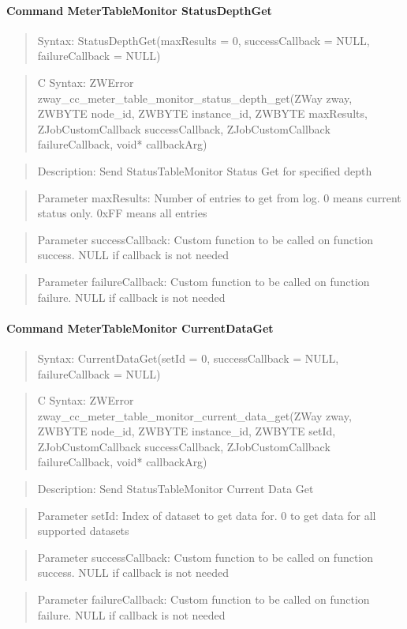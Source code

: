 \paragraph{Command MeterTableMonitor StatusDepthGet}
\begin{quote}Syntax: StatusDepthGet(maxResults = 0, successCallback = NULL, failureCallback = NULL)\end{quote}
\begin{quote}C Syntax: ZWError zway\_cc\_meter\_table\_monitor\_status\_depth\_get(ZWay zway, ZWBYTE node\_id, ZWBYTE instance\_id, ZWBYTE maxResults, ZJobCustomCallback successCallback, ZJobCustomCallback failureCallback, void* callbackArg)\end{quote}
\begin{quote}Description: Send StatusTableMonitor Status Get for specified depth\end{quote}
\begin{quote}Parameter maxResults: Number of entries to get from log. 0 means current status only. 0xFF means all entries\end{quote}
\begin{quote}Parameter successCallback: Custom function to be called on function success. NULL if callback is not needed\end{quote}
\begin{quote}Parameter failureCallback: Custom function to be called on function failure. NULL if callback is not needed\end{quote}


\paragraph{Command MeterTableMonitor CurrentDataGet}
\begin{quote}Syntax: CurrentDataGet(setId = 0, successCallback = NULL, failureCallback = NULL)\end{quote}
\begin{quote}C Syntax: ZWError zway\_cc\_meter\_table\_monitor\_current\_data\_get(ZWay zway, ZWBYTE node\_id, ZWBYTE instance\_id, ZWBYTE setId, ZJobCustomCallback successCallback, ZJobCustomCallback failureCallback, void* callbackArg)\end{quote}
\begin{quote}Description: Send StatusTableMonitor Current Data Get\end{quote}
\begin{quote}Parameter setId: Index of dataset to get data for. 0 to get data for all supported datasets\end{quote}
\begin{quote}Parameter successCallback: Custom function to be called on function success. NULL if callback is not needed\end{quote}
\begin{quote}Parameter failureCallback: Custom function to be called on function failure. NULL if callback is not needed\end{quote}


